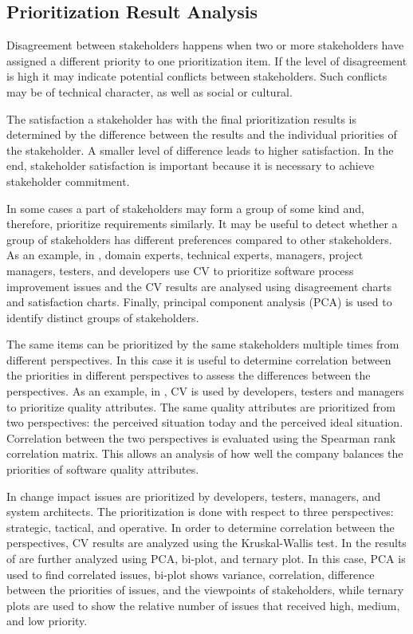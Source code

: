 \subsection{Prioritization Result Analysis}

Disagreement between stakeholders happens when two or more stakeholders have assigned
a different priority to one prioritization item. If the level of disagreement
is high it may indicate potential conflicts between stakeholders.
Such conflicts may be of technical character, as well as social or cultural.

The satisfaction a stakeholder has with the final prioritization results is
determined by the difference between the results and the individual priorities
of the stakeholder. A smaller level of difference leads to higher satisfaction.
In the end, stakeholder satisfaction is important because it is necessary to achieve
stakeholder commitment.

In some cases a part of stakeholders may form a group of some kind and, therefore, prioritize
requirements similarly. It may be useful
to detect whether a group of stakeholders has different preferences
compared to other stakeholders. As an example, in \cite{Pettersson2008}, domain experts,
technical experts, managers, project managers, testers, and developers
use CV to prioritize software process improvement issues and the CV results
are analysed using disagreement charts and satisfaction charts.
Finally, principal component analysis (PCA) is used to identify distinct
groups of stakeholders.

The same items can be prioritized by the same stakeholders multiple times
from different perspectives. In this case it is useful to determine correlation between
the priorities in different perspectives to assess the differences
between the perspectives. As an example, in \cite{Barney2009b}, CV is used by developers,
testers and managers to prioritize quality attributes. The same quality
attributes are prioritized from two perspectives: the perceived situation
today and the perceived ideal situation. Correlation between the two perspectives
is evaluated using the Spearman rank correlation matrix. This allows an analysis of
how well the company balances the priorities of software quality attributes.

In \cite{Jonsson2005} change impact issues are prioritized by developers,
testers, managers, and system architects. The prioritization is done
with respect to three perspectives: strategic, tactical, and operative.
In order to determine correlation between the perspectives, CV results are
analyzed using the Kruskal-Wallis test. In \cite{Chatzipetrou2010} the
results of \cite{Jonsson2005} are further analyzed using PCA, bi-plot, and
ternary plot. In this case, PCA is used to find correlated issues, 
bi-plot shows variance, correlation, difference between
the priorities of issues, and the viewpoints of stakeholders, while ternary
plots are used to show the relative number of issues that received high,
medium, and low priority.

